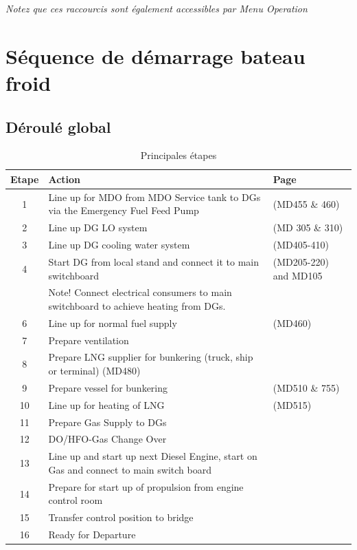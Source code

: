 \documentclass[12pt,a4paper]{article}
\begin{document}
\emph{Notez que ces raccourcis sont également accessibles par \emph{Menu} \emph{Operation}}


\section{Séquence de démarrage bateau froid}

\subsection{Déroulé global}

\begin{table}[htbp]
\scriptsize
\begin{tabular}{||c||l||l||}
\hline
Etape & Action & Page  \\ \hline
1 &  Line up for MDO from MDO Service tank to DGs via the Emergency Fuel Feed Pump & (MD455 \& 460) \\ \hline
2 &  Line up DG LO system & (MD 305 \& 310) \\ \hline
3 &  Line up DG cooling water system& (MD405-410) \\ \hline
4 &  Start DG from local stand and connect it to main switchboard & (MD205-220) and MD105 \\ 
& Note! Connect electrical consumers to main switchboard to achieve heating from DGs. & \\ \hline
6 &  Line up for normal fuel supply & (MD460) \\ \hline
7 &  Prepare ventilation & \\ \hline
8 &  Prepare LNG supplier for bunkering (truck, ship or terminal) (MD480) &\\ \hline
9 &  Prepare vessel for bunkering &(MD510 \& 755) \\ \hline
10 &  Line up for heating of LNG & (MD515) \\ \hline
11 &  Prepare Gas Supply to DGs & \\ \hline
12 &  DO/HFO-Gas Change Over &\\ \hline
13 &  Line up and start up next Diesel Engine, start on Gas and connect to main switch board &\\ \hline
14 &  Prepare for start up of propulsion from engine control room &\\ \hline
15 &  Transfer control position to bridge &\\ \hline
16 & Ready for Departure &\\ \hline
\end{tabular}
\caption{Principales étapes}
\label{}
\end{table}
\end{document}
